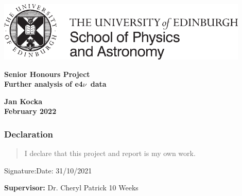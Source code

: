 \documentclass[a4paper,12pt]{article}
\newcommand{\efn}{e4$\nu$}
\begin{document}
\pagestyle{empty}
\par\noindent\includegraphics[width=12cm]{PandA_crest.pdf}
\par\noindent

\vspace*{2cm}

\begin{center}
        \Large\bf \Large\bf Senior Honours Project \\
        \LARGE\bf Further analysis of \efn\ data
\end{center}

\vspace*{0.5cm}

\begin{center}
        \bf Jan Kocka \\
        February 2022
\end{center}
\vspace*{5mm}

\begin{abstract}
    In this project we continue the work on data from \efn.
    We further inspect the data generated with GENIE, mainly looking at the Delta resonances and compare then to data from the CLAS experiment.
\end{abstract}

\vspace*{1cm}

\subsubsection*{Declaration}

\begin{quotation}
  I declare that this project and report is my own work.
\end{quotation}

\vspace*{2cm}
Signature:\hspace*{8cm}Date:  31/10/2021

\vfill
{\bf Supervisor:} Dr. Cheryl Patrick
\hfill
10 Weeks
\newpage

\pagestyle{plain}
\setcounter{page}{1}

\tableofcontents
\end{document}
